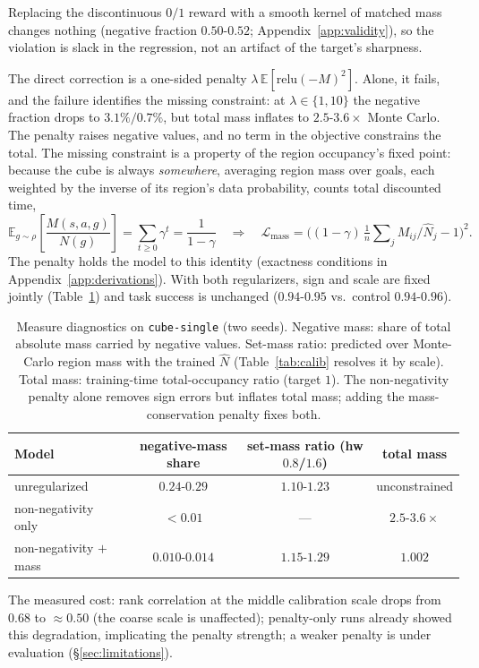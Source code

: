 \documentclass{article}
\newcommand{\E}{\mathbb{E}}
\newcommand{\Nhat}{\hat N}
\begin{document}
Replacing the discontinuous $0/1$ reward with a smooth kernel of matched mass changes nothing (negative fraction $0.50$-$0.52$; Appendix~\ref{app:validity}), so the violation is slack in the regression, not an artifact of the target's sharpness.

The direct correction is a one-sided penalty $\lambda\,\E[\mathrm{relu}(-M)^2]$.
Alone, it fails, and the failure identifies the missing constraint: at $\lambda\in\{1,10\}$ the negative fraction drops to $3.1\%/0.7\%$, but total mass inflates to $2.5$-$3.6\times$ Monte Carlo.
The penalty raises negative values, and no term in the objective constrains the total.
The missing constraint is a property of the region occupancy's fixed point: because the cube is always \emph{somewhere}, averaging region mass over goals, each weighted by the inverse of its region's data probability, counts total discounted time,
\begin{equation}
\label{eq:mass-anchor}
\E_{g\sim\rho}\!\left[\frac{M(s,a,g)}{N(g)}\right]=\sum_{t\ge0}\gamma^t =\frac{1}{1-\gamma} \quad\Longrightarrow\quad \mathcal{L}_{\mathrm{mass}} = \Big((1-\gamma)\,\tfrac{1}{n}\sum\nolimits_j M_{ij}/\Nhat_j-1\Big)^{2}.
\end{equation}
The penalty holds the model to this identity (exactness conditions in Appendix~\ref{app:derivations}).
With both regularizers, sign and scale are fixed jointly (Table~\ref{tab:measure}) and task success is unchanged ($0.94$-$0.95$ vs.\ control $0.94$-$0.96$).

\begin{table}[t]
\centering\small
\begin{tabular}{l ccc}
\toprule
Model & negative-mass share & set-mass ratio (hw $0.8$/$1.6$) & total mass \\
\midrule
unregularized               & $0.24$-$0.29$ & $1.10$-$1.23$ & unconstrained \\
non-negativity only        & $<0.01$        & ---            & $2.5$-$3.6\times$ \\
non-negativity $+$ mass    & $0.010$-$0.014$ & $1.15$-$1.29$ & $1.002$ \\
\bottomrule
\end{tabular}
\caption{Measure diagnostics on \texttt{cube-single} (two seeds).
Negative mass: share of total absolute mass carried by negative values.
Set-mass ratio: predicted over Monte-Carlo region mass with the trained $\Nhat$ (Table~\ref{tab:calib} resolves it by scale).
Total mass: training-time total-occupancy ratio (target $1$).
The non-negativity penalty alone removes sign errors but inflates total mass; adding the mass-conservation penalty fixes both.}
\label{tab:measure}
\end{table}
The measured cost: rank correlation at the middle calibration scale drops from $0.68$ to $\approx0.50$ (the coarse scale is unaffected); penalty-only runs already showed this degradation, implicating the penalty strength; a weaker penalty is under evaluation (\S\ref{sec:limitations}).
\end{document}

